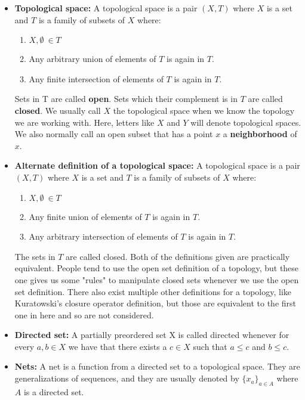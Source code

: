 \documentclass[a4paper]{article}
\begin{document}
\begin{itemize}

\item
\textbf{Topological space: }A topological space is a pair $(X,T)$ where $X$ is a set and $T$ is a family of subsets of $X$ where:
\begin{enumerate}
\item
$X,\emptyset\ \in T$
\item
Any arbitrary union of elements of $T$ is again in $T$.
\item
Any finite intersection of elements of $T$ is again in $T$.
\end{enumerate}
Sets in T are called \textbf{open}. Sets which their complement is in $T$ are called \textbf{closed}. We usually call $X$ the topological space when we know the topology we are working with. Here, letters like $X$ and $Y$ will denote topological spaces. We also normally call an open subset that has a point $x$ a \textbf{neighborhood} of $x$.

\item
\textbf{Alternate definition of a topological space: }A topological space is a pair $(X, T)$ where $X$ is a set and $T$ is a family of subsets of $X$ where:
\begin{enumerate}
\item
$X,\emptyset\ \in T$
\item
Any finite union of elements of $T$ is again in $T$.
\item
Any arbitrary intersection of elements of $T$ is again in $T$.
\end{enumerate}
The sets in $T$ are called closed. Both of the definitions given are practically equivalent. People tend to use the open set definition of a topology, but these one gives us some "rules" to manipulate closed sets whenever we use the open set definition. There also exist multiple other definitions for a topology, like Kuratowski's closure operator definition, but those are equivalent to the first one in here and so are not considered.

\item
\textbf{Directed set: }A partially preordered set X is called directed whenever for every $a,b\in X$ we have that there exists a $c\in X$ such that $a\leq c$ and $b\leq c$.

\item
\textbf{Nets: }A net is a function from a directed set to a topological space. They are generalizations of sequences, and they are usually denoted by $\{x_{a}\}_{a\in A}$ where $A$ is a directed set.


\end{itemize}
\end{document}
